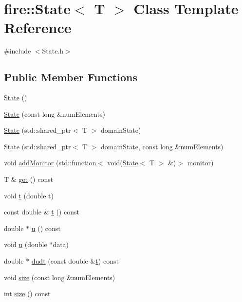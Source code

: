 \hypertarget{a00818}{}\section{fire\+:\+:State$<$ T $>$ Class Template Reference}
\label{a00818}


{\ttfamily \#include $<$State.\+h$>$}

\subsection*{Public Member Functions}
\begin{DoxyCompactItemize}
\item 
\hyperlink{a00818_a697d926ef53bfa150fdabb31db269c21}{State} ()
\item 
\hyperlink{a00818_a40fd4082cd305e2054208a0b9aaa6ad4}{State} (const long \&num\+Elements)
\item 
\hyperlink{a00818_a1882f10811364f7eaa8732514bef43cf}{State} (std\+::shared\+\_\+ptr$<$ T $>$ domain\+State)
\item 
\hyperlink{a00818_adb435ffb356eb26cf62876ede99b9a30}{State} (std\+::shared\+\_\+ptr$<$ T $>$ domain\+State, const long \&num\+Elements)
\item 
void \hyperlink{a00818_adfb16dbbaab3549c09da734605f815a3}{add\+Monitor} (std\+::function$<$ void(\hyperlink{a00818}{State}$<$ T $>$ \&)$>$ monitor)
\item 
T \& \hyperlink{a00818_a71cec682edafbf5c3b09e9d6dc91f12b}{get} () const
\item 
void \hyperlink{a00818_a5d8acc4d5bdd8942de10d34c55680349}{t} (double t)
\item 
const double \& \hyperlink{a00818_a425a0236c4edc506b30196d352118104}{t} () const
\item 
double $\ast$ \hyperlink{a00818_a54507a9e31127580a2c485ce9829934e}{u} () const
\item 
void \hyperlink{a00818_a1b6b91c51fe4d53f268a33c77fecff11}{u} (double $\ast$data)
\item 
double $\ast$ \hyperlink{a00818_a4d20304931607c1cb27358fb3776a620}{dudt} (const double \&\hyperlink{a00818_a5d8acc4d5bdd8942de10d34c55680349}{t}) const
\item 
void \hyperlink{a00818_a22b2d9e2feb153c819e90a4ac7ee8d72}{size} (const long \&num\+Elements)
\item 
int \hyperlink{a00818_a19f1d7b5ce637db79b96f29bd146842a}{size} () const
\item 

\end{DoxyCompactItemize}
